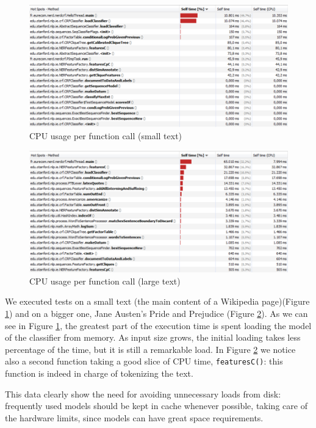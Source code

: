 \documentclass[a4paper,11pt]{report}
\begin{document}
\begin{figure}[htbp] 
\centering
\includegraphics[width=\textwidth]{functions}
\caption{CPU usage per function call (small text)}
\label{fig:profile1}
\end{figure}

\begin{figure}[htbp] 
\centering
\includegraphics[width=\textwidth]{functions2}
\caption{CPU usage per function call (large text)}
\label{fig:profile2}
\end{figure}

We executed tests on a small text (the main content of a Wikipedia page)(Figure \ref{fig:profile1}) and on a bigger one, Jane Austen's Pride and Prejudice (Figure \ref{fig:profile2}).
As we can see in Figure \ref{fig:profile1}, the greatest part of the execution time is spent loading the model of the classifier from memory. As input size grows, the initial loading takes less percentage of the time, but it is still a remarkable load. In Figure \ref{fig:profile2} we notice also a second function taking a good slice of CPU time, \texttt{featuresC()}: this function is indeed in charge of tokenizing the text.

This data clearly show the need for avoiding unnecessary loads from disk: frequently used models should be kept in cache whenever possible, taking care of the hardware limits, since models can have great space requirements.
\end{document}
